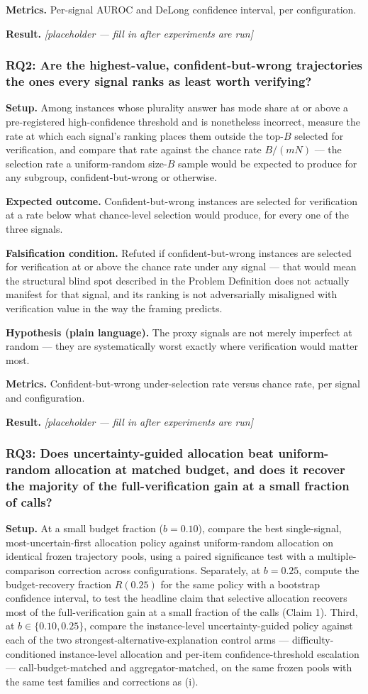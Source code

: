 \documentclass[11pt]{article}
\newcommand{\ph}{\textit{[placeholder --- fill in after experiments are run]}}
\begin{document}
\textbf{Metrics.} Per-signal AUROC and DeLong confidence interval, per configuration.

\textbf{Result.} \ph

\subsubsection{RQ2: Are the highest-value, confident-but-wrong trajectories the ones every signal ranks as least worth verifying?}
\textbf{Setup.} Among instances whose plurality answer has mode share at or above a pre-registered high-confidence threshold and is nonetheless incorrect, measure the rate at which each signal's ranking places them outside the top-$B$ selected for verification, and compare that rate against the chance rate $B / (mN)$ --- the selection rate a uniform-random size-$B$ sample would be expected to produce for any subgroup, confident-but-wrong or otherwise.

\textbf{Expected outcome.} Confident-but-wrong instances are selected for verification at a rate below what chance-level selection would produce, for every one of the three signals.

\textbf{Falsification condition.} Refuted if confident-but-wrong instances are selected for verification at or above the chance rate under any signal --- that would mean the structural blind spot described in the Problem Definition does not actually manifest for that signal, and its ranking is not adversarially misaligned with verification value in the way the framing predicts.

\textbf{Hypothesis (plain language).} The proxy signals are not merely imperfect at random --- they are systematically worst exactly where verification would matter most.

\textbf{Metrics.} Confident-but-wrong under-selection rate versus chance rate, per signal and configuration.

\textbf{Result.} \ph

\subsubsection{RQ3: Does uncertainty-guided allocation beat uniform-random allocation at matched budget, and does it recover the majority of the full-verification gain at a small fraction of calls?}
\textbf{Setup.} At a small budget fraction ($b = 0.10$), compare the best single-signal, most-uncertain-first allocation policy against uniform-random allocation on identical frozen trajectory pools, using a paired significance test with a multiple-comparison correction across configurations. Separately, at $b = 0.25$, compute the budget-recovery fraction $R(0.25)$ for the same policy with a bootstrap confidence interval, to test the headline claim that selective allocation recovers most of the full-verification gain at a small fraction of the calls (Claim 1). Third, at $b \in \{0.10, 0.25\}$, compare the instance-level uncertainty-guided policy against each of the two strongest-alternative-explanation control arms --- difficulty-conditioned instance-level allocation and per-item confidence-threshold escalation --- call-budget-matched and aggregator-matched, on the same frozen pools with the same test families and corrections as (i).
\end{document}
